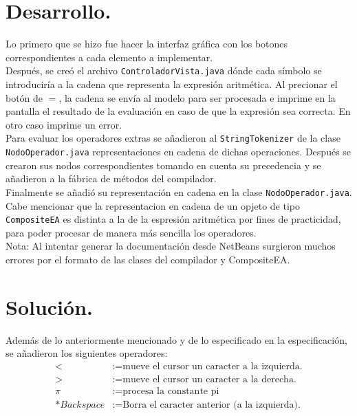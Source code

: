 \documentclass[a4paper,12pt]{report}
\begin{document}
\section*{Desarrollo.}{
    Lo primero que se hizo fue hacer la interfaz gráfica con los botones
    correspondientes a cada elemento a implementar.\\
    Después, se creó el archivo \texttt{ControladorVista.java} dónde cada
    símbolo se introduciría a la cadena que representa la expresión aritmética.
    Al precionar el botón de $=$, la cadena se envía al modelo para ser
    procesada e imprime en la pantalla el resultado de la evaluación en caso de
    que la expresión sea correcta. En otro caso imprime un error.\\
    Para evaluar los operadores extras se añadieron al \texttt{StringTokenizer}
    de la clase \texttt{NodoOperador.java} representaciones en cadena de dichas
    operaciones. Después se crearon sus nodos correspondientes tomando en cuenta
    su precedencia y se añadieron a la fábrica de métodos del compilador.\\
    Finalmente se añadió su representación en cadena en la clase
    \texttt{NodoOperador.java}. Cabe mencionar que la representacion en cadena
    de un opjeto de tipo \texttt{CompositeEA} es distinta a la de la espresión
    aritmética por fines de practicidad, para poder procesar de manera más
    sencilla los operadores.\\
    Nota: Al intentar generar la documentación desde NetBeans surgieron muchos
    errores por el formato de las clases del compilador y CompositeEA.
}
\section*{Solución.}{
    Además de lo anteriormente mencionado y de lo especificado en la
    especificación, se añadieron los siguientes operadores:
    \begin{align*}
        < &:= \text{mueve el cursor un caracter a la izquierda.}\\
        > &:= \text{mueve el cursor un caracter a la derecha.}\\
        \pi &:= \text{procesa la constante pi}\\
        *Backspace &:= \text{Borra el caracter anterior (a la izquierda).}
    \end{align*}
}

\begin{thebibliography}{}
\end{thebibliography}
\end{document}
